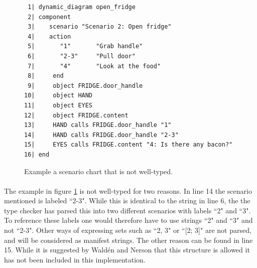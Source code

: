 \begin{figure}[H]
{\footnotesize
\begin{verbatim}
 1| dynamic_diagram open_fridge
 2| component
 3|    scenario "Scenario 2: Open fridge"
 4|    action
 5|       "1"       "Grab handle"
 6|       "2-3"     "Pull door"
 7|       "4"       "Look at the food"
 8|     end
 9|     object FRIDGE.door_handle 
10|     object HAND
11|     object EYES
12|     object FRIDGE.content
13|     HAND calls FRIDGE.door_handle "1"
14|     HAND calls FRIDGE.door_handle "2-3"
15|     EYES calls FRIDGE.content "4: Is there any bacon?"
16| end
\end{verbatim}
}
\caption{Example a scenario chart that is not well-typed.}
\label{fig:not_well_typed}
\end{figure}

\paragraph{}
The example in figure \ref{fig:not_well_typed} is not well-typed for two reasons. In line 14 the scenario mentioned is labeled ``2-3". While this is identical to the string in line 6, the the type checker has parsed this into two different scenarios with labels ``2" and ``3". To reference these labels one would therefore have to use strings ``2" and ``3" and not ``2-3". Other ways of expressing sets such as ``2, 3" or ``[2; 3]" are not parsed, and will be considered as manifest strings. The other reason can be found in line 15. While it is suggested by Wald\'{e}n and Nerson that this structure is allowed it has not been included in this implementation.